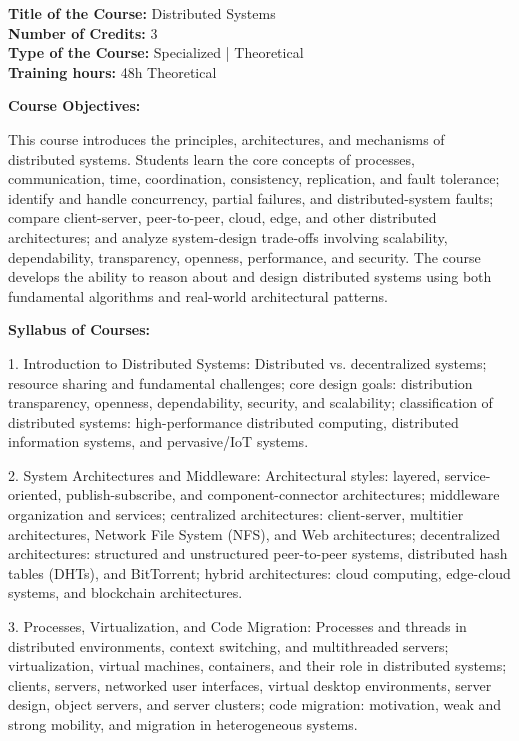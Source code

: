\documentclass[12pt,a4paper]{article}
\begin{document}
\newpage
\textbf{Title of the Course:} Distributed Systems\\
\textbf{Number of Credits:} 3\\
\textbf{Type of the Course:} Specialized | Theoretical\\
\textbf{Training hours:} 48h Theoretical\par\vspace{4pt}
\textbf{Course Objectives:}\par\vspace{2pt}
This course introduces the principles, architectures, and mechanisms of distributed systems. Students learn the core concepts of processes, communication, time, coordination, consistency, replication, and fault tolerance; identify and handle concurrency, partial failures, and distributed-system faults; compare client-server, peer-to-peer, cloud, edge, and other distributed architectures; and analyze system-design trade-offs involving scalability, dependability, transparency, openness, performance, and security. The course develops the ability to reason about and design distributed systems using both fundamental algorithms and real-world architectural patterns.\par\vspace{4pt}
\textbf{Syllabus of Courses:}\par\vspace{2pt}
1. Introduction to Distributed Systems: Distributed vs. decentralized systems; resource sharing and fundamental challenges; core design goals: distribution transparency, openness, dependability, security, and scalability; classification of distributed systems: high-performance distributed computing, distributed information systems, and pervasive/IoT systems.\par
2. System Architectures and Middleware: Architectural styles: layered, service-oriented, publish-subscribe, and component-connector architectures; middleware organization and services; centralized architectures: client-server, multitier architectures, Network File System (NFS), and Web architectures; decentralized architectures: structured and unstructured peer-to-peer systems, distributed hash tables (DHTs), and BitTorrent; hybrid architectures: cloud computing, edge-cloud systems, and blockchain architectures.\par
3. Processes, Virtualization, and Code Migration: Processes and threads in distributed environments, context switching, and multithreaded servers; virtualization, virtual machines, containers, and their role in distributed systems; clients, servers, networked user interfaces, virtual desktop environments, server design, object servers, and server clusters; code migration: motivation, weak and strong mobility, and migration in heterogeneous systems.\par
\end{document}
